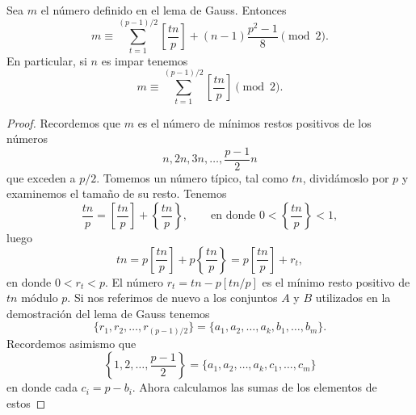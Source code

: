\documentclass[12pt,a4paper]{book}
\begin{document}
    \begin{teorema}\label{teo:9-7}
        Sea $m$ el número definido en el lema de Gauss. Entonces
        \begin{equation*}
            m\equiv\sum_{t=1}^{(p-1)/2}\left[\frac{tn}{p}\right]+(n-1)\frac{p^{2}-1}{8}\pmod{2}.
        \end{equation*}
        En particular, si $n$ es impar tenemos
        \begin{equation*}
            m\equiv\sum_{t=1}^{(p-1)/2}\left[\frac{tn}{p}\right]\pmod{2}.
        \end{equation*}
    \end{teorema}

    \begin{proof}
        Recordemos que $m$ es el número de mínimos restos positivos de los números
        \begin{equation*}
            n,2n,3n,\dots,\frac{p-1}{2}n
        \end{equation*}
        que exceden a $p/2$. Tomemos un número típico, tal como $tn$, dividámoslo por $p$ y
        examinemos el tamaño de su resto. Tenemos
        \begin{equation*}
            \frac{tn}{p}=\left[\frac{tn}{p}\right]+\left\{\frac{tn}{p}\right\},\qquad
            \text{en donde }0<\left\{\frac{tn}{p}\right\}<1,
        \end{equation*}
        luego
        \begin{equation*}
            tn=p\left[\frac{tn}{p}\right]+p\left\{\frac{tn}{p}\right\}=p\left[\frac{tn}{p}\right]+r_{t},
        \end{equation*}
        en donde $0<r_{t}<p$. El número $r_{t}=tn-p[tn/p]$ es el mínimo resto positivo de $tn$
        módulo $p$. Si nos referimos de nuevo a los conjuntos $A$ y $B$ utilizados en la
        demostración del lema de Gauss tenemos
        \begin{equation*}
            \{r_{1},r_{2},\dots,r_{(p-1)/2}\}=\{a_{1},a_{2},\dots,a_{k},b_{1},\dots,b_{m}\}.
        \end{equation*}
        Recordemos asimismo que
        \begin{equation*}
            \left\{1,2,\dots,\frac{p-1}{2}\right\}=\{a_{1},a_{2},\dots,a_{k},c_{1},\dots,c_{m}\}
        \end{equation*}
        en donde cada $c_{i}=p-b_{i}$. Ahora calculamos las sumas de los elementos de estos

\end{proof}
\end{document}
